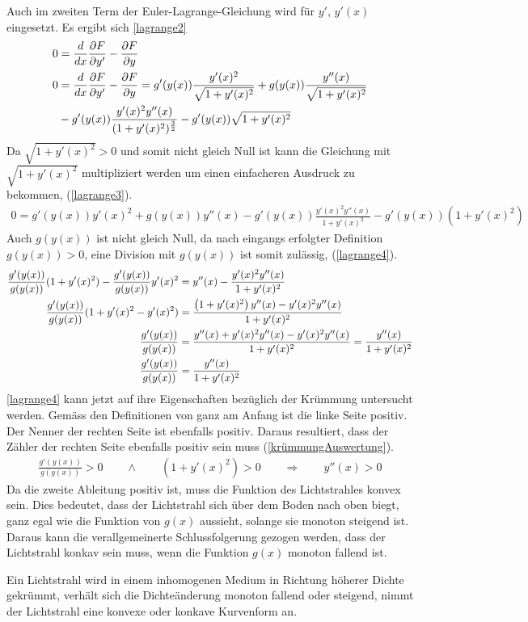 Auch im zweiten Term der Euler-Lagrange-Gleichung wird für $y'$, $y'(x)$ eingesetzt. Es ergibt sich \eqref{lagrange2}
\begin{align}
	0 &= \frac{d}{dx} \frac{\partial F}{\partial y'} - \frac{\partial F}{\partial y} \label{lagrangePrinzip} \\
		0 &= \frac{d}{dx} \frac{\partial F}{\partial y'} - \frac{\partial F}{\partial y}
	= g'(y(x)) \frac{y'(x)^2}{\sqrt{1 + y'(x)^2}} + g(y(x)) \frac{y''(x)}{\sqrt{1 + y'(x)^2}} \notag \\
	&- g'(y(x)) \frac{y'(x)^2 y''(x)}{(1 + y'(x)^2)^\frac{3}{2}}  - g'(y(x)) \sqrt{1 + y'(x)^2}
	\label{lagrange2}
\end{align}
Da $\sqrt{1 + y'(x)^2} > 0$ und somit nicht gleich Null ist kann die Gleichung mit $\sqrt{1 + y'(x)^2}$  multipliziert werden um einen einfacheren Ausdruck zu bekommen, (\eqref{lagrange3}).
\begin{align}
	0 = g'(y(x)) y'(x)^2 + g(y(x)) y''(x) - g'(y(x)) \frac{y'(x)^2 y''(x)}{1 + y'(x)^2} - g'(y(x)) (1 + y'(x)^2)
	\label{lagrange3}
\end{align}
Auch $g(y(x))$ ist nicht gleich Null, da nach eingangs erfolgter Definition $g(y(x)) > 0$, eine Division mit $g(y(x))$ ist somit zulässig, (\eqref{lagrange4}).
\begin{align}
	\frac{g'(y(x))}{g(y(x))} (1 + y'(x)^2) - \frac{g'(y(x))}{g(y(x))} y'(x)^2 &=  y''(x) - \frac{y'(x)^2 y''(x)}{1 + y'(x)^2} \notag \\
	\frac{g'(y(x))}{g(y(x))} (1 + y'(x)^2 - y'(x)^2) &= \frac{\left(1 + y'(x)^2 \right)y''(x) - y'(x)^2 y''(x)}{1 + y'(x)^2} \notag \\
	\frac{g'(y(x))}{g(y(x))} &= \frac{y''(x) + y'(x)^2 y''(x) - y'(x)^2 y''(x)}{1 + y'(x)^2} = \frac{y''(x)}{1 + y'(x)^2}\notag \\
	\frac{g'(y(x))}{g(y(x))} &= \frac{y''(x)}{1 + y'(x)^2}
	\label{lagrange4}
\end{align}
\eqref{lagrange4} kann jetzt auf ihre Eigenschaften bezüglich der Krümmung untersucht werden. Gemäss den Definitionen von ganz am Anfang ist die linke Seite positiv. 
Der Nenner der rechten Seite ist ebenfalls positiv. Daraus resultiert, dass der Zähler der rechten Seite ebenfalls positiv sein muss (\eqref{krümmungAuswertung}).
\begin{align}
	\frac{g'(y(x))}{g(y(x))} > 0 \qquad \wedge \qquad (1 + y'(x)^2) > 0 \qquad \Rightarrow \qquad y''(x) > 0
	\label{krümmungAuswertung}
\end{align}
Da die zweite Ableitung positiv ist, muss die Funktion des Lichtstrahles konvex sein.
Dies bedeutet, dass der Lichtstrahl sich über dem Boden nach oben biegt, ganz egal wie die Funktion von $g(x)$ aussieht, solange sie monoton steigend ist.
Daraus kann die verallgemeinerte Schlussfolgerung gezogen werden, dass der Lichtstrahl konkav sein muss, wenn die Funktion $g(x)$ monoton fallend ist.
\begin{satz}
Ein Lichtstrahl wird in einem inhomogenen Medium in Richtung höherer Dichte gekrümmt, verhält sich die Dichteänderung monoton fallend oder steigend, nimmt der Lichtstrahl eine konvexe oder konkave Kurvenform an.
\end{satz}
